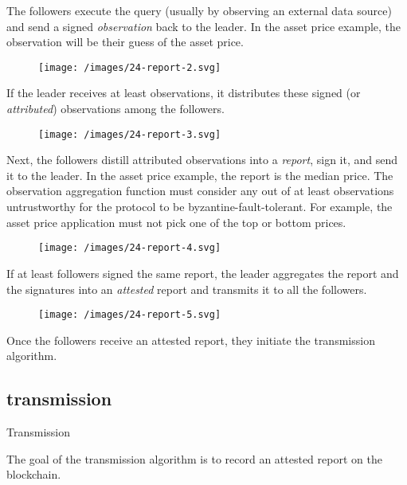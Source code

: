 \documentclass{article}
\begin{document}
The followers execute the query (usually by observing an external data source) and send a signed \emph{observation} back to the leader.
In the asset price example, the observation will be their guess of the asset price.
\begin{figure}[grayscale-diagram,medium-size]
\texttt{[image: /images/24-report-2.svg]}
\end{figure}

If the leader receives at least  observations, it distributes these signed (or \emph{attributed}) observations among the followers.
\begin{figure}[grayscale-diagram,medium-size]
\texttt{[image: /images/24-report-3.svg]}
\end{figure}

Next, the followers distill attributed observations into a \emph{report}, sign it, and send it to the leader.
In the asset price example, the report is the median price.
The observation aggregation function must consider any  out of at least  observations untrustworthy for the protocol to be byzantine-fault-tolerant.
For example, the asset price application must not pick one of the top or bottom  prices.
\begin{figure}[grayscale-diagram,medium-size]
\texttt{[image: /images/24-report-4.svg]}
\end{figure}

If at least  followers signed the same report, the leader aggregates the report and the signatures into an \emph{attested} report and transmits it to all the followers.
\begin{figure}[grayscale-diagram,medium-size]
\texttt{[image: /images/24-report-5.svg]}
\end{figure}

Once the followers receive an attested report, they initiate the transmission algorithm.

\subsection{transmission}{Transmission}

The goal of the transmission algorithm is to record an attested report on the blockchain.
\end{document}
